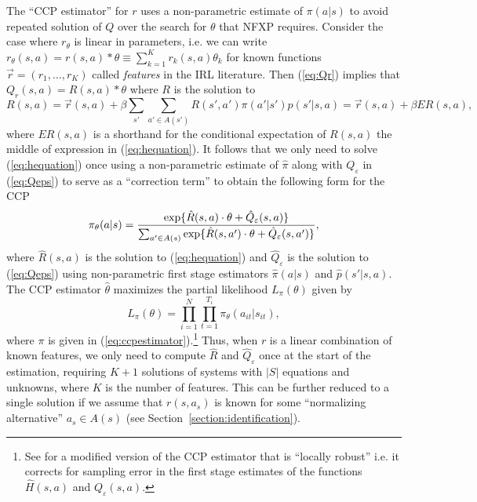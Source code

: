 The ``CCP estimator'' \citep{hotzmiller:1993}
for $r$ uses a non-parametric estimate of $\pi(a|s)$ to avoid repeated
solution of $Q$ over the search for $\theta$ that NFXP requires. Consider the case where $r_\theta$ is linear in parameters,
i.e. we can write $r_\theta(s,a)=r(s,a)*\theta \equiv \sum_{k=1}^K r_k(s,a)\theta_k$ for known functions
 $\vec{r}=(r_1,\ldots,r_K)$ called {\it features\/} in the IRL
literature. Then (\ref{eq:Qr}) implies that $Q_r(s,a)=R(s,a)*\theta$ where
$R$ is the solution to
\begin{equation}
   R(s,a)=\vec{r}(s,a) + \beta \sum_{s'} \sum_{a' \in A(s')} R(s',a')\pi(a'|s')p(s'|s,a) = \vec{r}(s,a)+\beta ER(s,a),
\label{eq:hequation}
\end{equation}
where $ER(s,a)$ is a shorthand for the conditional expectation of $R(s,a)$ the middle of expression in (\ref{eq:hequation}).
It follows that we only need to solve (\ref{eq:hequation}) once using a non-parametric estimate of $\hat\pi$ along with
$Q_\varepsilon$ in (\ref{eq:Qeps}) to serve as a ``correction term''  to obtain the following form for the CCP
\begin{equation}  
           \pi_\theta(a|s) = {\exp\{\hat R(s,a)\cdot\theta+\hat Q_\varepsilon(s,a)\} \over \sum_{a' \in A(s)}
\exp\{\hat R(s,a')\cdot\theta+\hat Q_\varepsilon(s,a')\}},
\label{eq:ccpestimator}
\end{equation}
where $\hat R(s,a)$ is the solution to (\ref{eq:hequation}) and $\hat Q_\varepsilon$ is the solution
to (\ref{eq:Qeps}) using non-parametric first stage
estimators $\hat\pi(a|s)$ and $\hat p(s'|s,a)$. The CCP estimator $\hat\theta$ maximizes the partial likelihood $L_\pi(\theta)$ given by 
\begin{equation}
    L_\pi(\theta) = \prod_{i=1}^N \prod_{t=1}^{T_i}  \pi_\theta(a_{it}|s_{it}),
\label{eq:ccplf}
\end{equation}
where $\pi$ is given in (\ref{eq:ccpestimator}).\footnote{\footnotesize See \citet{lrspe:2022} 
for  a modified version of the CCP estimator that is ``locally robust'' i.e. it corrects for sampling
error in the first stage estimates of the functions $\hat H(s,a)$ and $Q_\varepsilon(s,a)$.}
Thus, when $r$ is a  linear combination of known features, we only  need to compute $\hat R$ and $\hat Q_\varepsilon$ once
at the start of the estimation, requiring  $K+1$ solutions of systems with $|S|$ equations and unknowns,
where $K$ is the number of features. This can be further reduced to
a single solution if we assume that $r(s,a_s)$ is known for some
``normalizing alternative'' $a_s \in A(s)$ (see Section~\ref{section:identification}).

